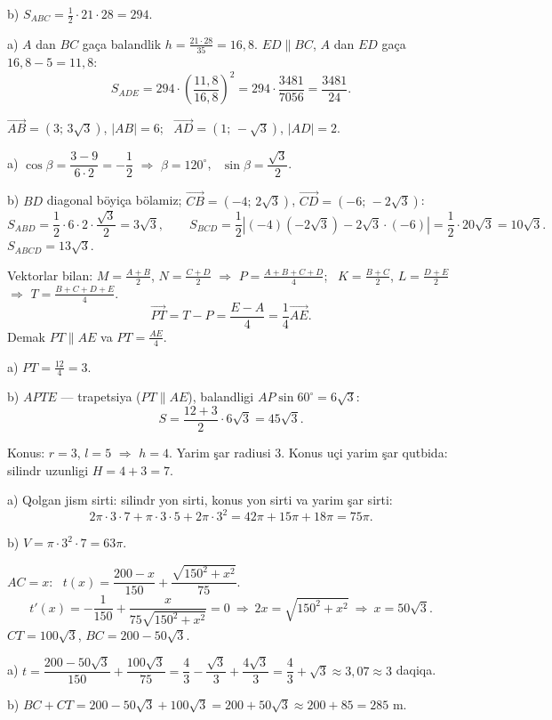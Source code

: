b) $S_{ABC}=\frac12\cdot21\cdot28=294$.

a) $A$ dan $BC$ gaça balandlik $h=\frac{21\cdot28}{35}=16{,}8$. $ED\parallel BC$, $A$ dan $ED$ gaça $16{,}8-5=11{,}8$:
\[S_{ADE}=294\cdot\left(\frac{11{,}8}{16{,}8}\right)^2=294\cdot\frac{3481}{7056}=\frac{3481}{24}.\]

\newpage
{}
$\vec{AB}=\left(3;\,3\sqrt3\right)$, $|AB|=6$; \ $\vec{AD}=\left(1;\,-\sqrt3\right)$, $|AD|=2$.

a) $\cos\beta=\dfrac{3-9}{6\cdot2}=-\dfrac12$ $\Rightarrow$ $\beta=120^\circ$, \ $\sin\beta=\dfrac{\sqrt3}2$.

b) $BD$ diagonal böyiça bölamiz; $\vec{CB}=\left(-4;\,2\sqrt3\right)$, $\vec{CD}=\left(-6;\,-2\sqrt3\right)$:
\[S_{ABD}=\frac12\cdot6\cdot2\cdot\frac{\sqrt3}2=3\sqrt3,\qquad S_{BCD}=\frac12\left|(-4)\left(-2\sqrt3\right)-2\sqrt3\cdot(-6)\right|=\frac12\cdot20\sqrt3=10\sqrt3.\]
$S_{ABCD}=13\sqrt3$.

\newpage
{}
Vektorlar bilan: $M=\frac{A+B}2$, $N=\frac{C+D}2$ $\Rightarrow$ $P=\frac{A+B+C+D}4$; \ $K=\frac{B+C}2$, $L=\frac{D+E}2$ $\Rightarrow$ $T=\frac{B+C+D+E}4$.
\[\vec{PT}=T-P=\frac{E-A}4=\frac14\vec{AE}.\]
Demak $PT\parallel AE$ va $PT=\frac{AE}4$.

a) $PT=\frac{12}4=3$.

b) $APTE$ — trapetsiya ($PT\parallel AE$), balandligi $AP\sin60^\circ=6\sqrt3$:
\[S=\frac{12+3}2\cdot6\sqrt3=45\sqrt3.\]

\newpage
{}
Konus: $r=3$, $l=5$ $\Rightarrow$ $h=4$. Yarim şar radiusi $3$. Konus uçi yarim şar qutbida: silindr uzunligi $H=4+3=7$.

a) Qolgan jism sirti: silindr yon sirti, konus yon sirti va yarim şar sirti:
\[2\pi\cdot3\cdot7+\pi\cdot3\cdot5+2\pi\cdot3^2=42\pi+15\pi+18\pi=75\pi.\]

b) $V=\pi\cdot3^2\cdot7=63\pi$.

\newpage
{}
$AC=x$: \ $t(x)=\dfrac{200-x}{150}+\dfrac{\sqrt{150^2+x^2}}{75}$.
\[t'(x)=-\frac1{150}+\frac x{75\sqrt{150^2+x^2}}=0\ \Rightarrow\ 2x=\sqrt{150^2+x^2}\ \Rightarrow\ x=50\sqrt3.\]
$CT=100\sqrt3$, $BC=200-50\sqrt3$.

a) $t=\dfrac{200-50\sqrt3}{150}+\dfrac{100\sqrt3}{75}=\dfrac43-\dfrac{\sqrt3}3+\dfrac{4\sqrt3}3=\dfrac43+\sqrt3\approx3{,}07\approx3$ daqiqa.

b) $BC+CT=200-50\sqrt3+100\sqrt3=200+50\sqrt3\approx200+85=285$ m.

\ShowJavoblar

